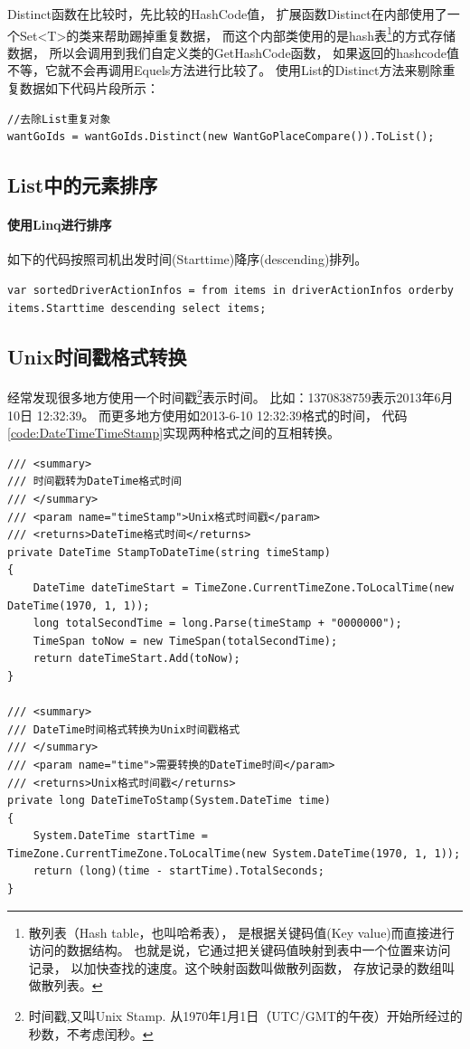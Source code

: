 \documentclass{book}
\begin{document}
Distinct函数在比较时，先比较的HashCode值，
扩展函数Distinct在内部使用了一个Set<T>的类来帮助踢掉重复数据，
而这个内部类使用的是hash表\footnote{散列表（Hash table，也叫哈希表），
是根据关键码值(Key value)而直接进行访问的数据结构。
也就是说，它通过把关键码值映射到表中一个位置来访问记录，
以加快查找的速度。这个映射函数叫做散列函数，
存放记录的数组叫做散列表。}的方式存储数据，
所以会调用到我们自定义类的GetHashCode函数，
如果返回的hashcode值不等，它就不会再调用Equels方法进行比较了。
使用List的Distinct方法来剔除重复数据如下代码片段所示：

\begin{lstlisting}[language={[Sharp]C}]
//去除List重复对象
wantGoIds = wantGoIds.Distinct(new WantGoPlaceCompare()).ToList();
\end{lstlisting}

\subsection{List中的元素排序}

\paragraph{使用Linq进行排序}

如下的代码按照司机出发时间(Starttime)降序(descending)排列。

\begin{lstlisting}[language={[Sharp]C}]
var sortedDriverActionInfos = from items in driverActionInfos orderby items.Starttime descending select items;
\end{lstlisting}

\subsection{Unix时间戳格式转换}

经常发现很多地方使用一个时间戳\footnote{时间戳,又叫Unix Stamp. 
从1970年1月1日（UTC/GMT的午夜）开始所经过的秒数，不考虑闰秒。}表示时间。
比如：1370838759表示2013年6月10日 12:32:39。
而更多地方使用如2013-6-10 12:32:39格式的时间， 
代码\ref{code:DateTimeTimeStamp}实现两种格式之间的互相转换。

\begin{lstlisting}[language={[Sharp]C},caption=时间戳与DateTime转换,label={code:DateTimeTimeStamp}]
/// <summary>
/// 时间戳转为DateTime格式时间
/// </summary>
/// <param name="timeStamp">Unix格式时间戳</param>
/// <returns>DateTime格式时间</returns> 
private DateTime StampToDateTime(string timeStamp)
{
    DateTime dateTimeStart = TimeZone.CurrentTimeZone.ToLocalTime(new DateTime(1970, 1, 1));
    long totalSecondTime = long.Parse(timeStamp + "0000000");
    TimeSpan toNow = new TimeSpan(totalSecondTime);
    return dateTimeStart.Add(toNow);
}

/// <summary>
/// DateTime时间格式转换为Unix时间戳格式
/// </summary>
/// <param name="time">需要转换的DateTime时间</param>
/// <returns>Unix格式时间戳</returns> 
private long DateTimeToStamp(System.DateTime time)
{
    System.DateTime startTime = TimeZone.CurrentTimeZone.ToLocalTime(new System.DateTime(1970, 1, 1));
    return (long)(time - startTime).TotalSeconds;
}
\end{lstlisting}
\end{document}
